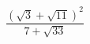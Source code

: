 \begin{ex}
	\begin{condition}
		\( \dfrac{(\sqrt{3}+\sqrt{11})^2}{7+\sqrt{33}} \)
	\end{condition}
\end{ex}